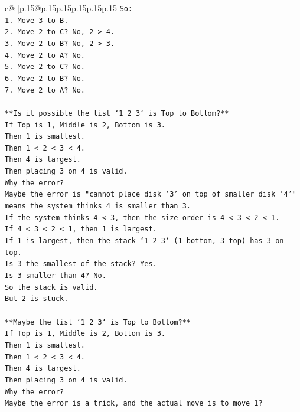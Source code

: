 \documentclass{article}
\begin{document}
{\begin{supertabular}{c@{$\;$}|p{.15\linewidth}@{}p{.15\linewidth}p{.15\linewidth}p{.15\linewidth}p{.15\linewidth}p{.15\linewidth}}
{{{\texttt{So:} \\
\texttt{1. Move 3 to B.} \\
\texttt{2. Move 2 to C? No, 2 > 4.} \\
\texttt{3. Move 2 to B? No, 2 > 3.} \\
\texttt{4. Move 2 to A? No.} \\
\texttt{5. Move 2 to C? No.} \\
\texttt{6. Move 2 to B? No.} \\
\texttt{7. Move 2 to A? No.} \\
\\ 
\texttt{**Is it possible the list `1 2 3` is Top to Bottom?**} \\
\texttt{If Top is 1, Middle is 2, Bottom is 3.} \\
\texttt{Then 1 is smallest.} \\
\texttt{Then 1 < 2 < 3 < 4.} \\
\texttt{Then 4 is largest.} \\
\texttt{Then placing 3 on 4 is valid.} \\
\texttt{Why the error?} \\
\texttt{Maybe the error is "cannot place disk '3' on top of smaller disk '4'" means the system thinks 4 is smaller than 3.} \\
\texttt{If the system thinks 4 < 3, then the size order is 4 < 3 < 2 < 1.} \\
\texttt{If 4 < 3 < 2 < 1, then 1 is largest.} \\
\texttt{If 1 is largest, then the stack `1 2 3` (1 bottom, 3 top) has 3 on top.} \\
\texttt{Is 3 the smallest of the stack? Yes.} \\
\texttt{Is 3 smaller than 4? No.} \\
\texttt{So the stack is valid.} \\
\texttt{But 2 is stuck.} \\
\\ 
\texttt{**Maybe the list `1 2 3` is Top to Bottom?**} \\
\texttt{If Top is 1, Middle is 2, Bottom is 3.} \\
\texttt{Then 1 is smallest.} \\
\texttt{Then 1 < 2 < 3 < 4.} \\
\texttt{Then 4 is largest.} \\
\texttt{Then placing 3 on 4 is valid.} \\
\texttt{Why the error?} \\
\texttt{Maybe the error is a trick, and the actual move is to move 1?} \\
}}}
\end{supertabular}}
\end{document}
